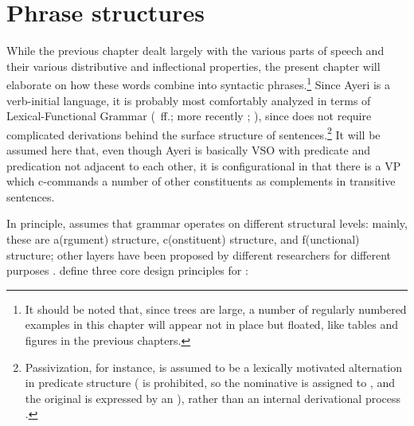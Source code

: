 

\chapter{Phrase structures}
\label{ch:phrasestruct}

While the previous chapter dealt largely with the various parts of speech and
their various distributive and inflectional properties, the present chapter
will elaborate on how these words combine into syntactic phrases.\footnote{It
should be noted that, since trees are large, a number of regularly numbered
examples in this chapter will appear not in place but floated, like tables and
figures in the previous chapters.} Since Ayeri is a verb-initial language, it
is probably most comfortably analyzed in terms of Lexical-Functional Grammar
(\cite{bresnan1982}~ff.; more recently \cite{bresnan2016};
\cite{dalrymple2001}), since \Lfg{} does not require complicated derivations
behind the surface structure of sentences.\footnote{Passivization, for
instance, is assumed to be a lexically motivated alternation in predicate
structure (\Subj{} is prohibited, so the nominative is assigned to \Obj{}, and
the original \Subj{} is expressed  by an \Adjc{}), rather than an internal
derivational process \citep[23\psqq]{bresnan2016}.} It will be assumed here
that, even though Ayeri is basically VSO with predicate and predication not
adjacent to each other, it is configurational in that there is a VP which
c-commands a number of other constituents as complements in transitive
sentences.

In principle, \Lfg{} assumes that grammar operates on different structural 
levels: mainly, these are a(rgument) structure, c(onstituent) structure, and 
f(unctional) structure; other layers have been proposed by different 
researchers for different purposes \citep[862--865]{buttking2015}. 
\citet{bresnan2016} define three core design principles for \Lfg{}:

